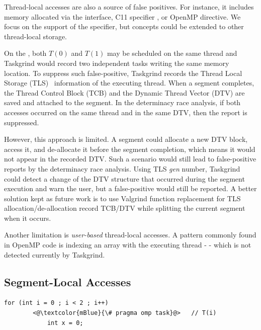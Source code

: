 Thread-local accesses are also a source of false positives.
For instance, it includes memory allocated via the  interface, C11 specifier , or OpenMP  directive.
We focus on the support of the  specifier, but concepts could be extended to other thread-local storage.

On the , both $T(0)$ and $T(1)$ may be scheduled on the same thread and Taskgrind would record two independent tasks writing the same memory location.
To suppress such false-positive, Taskgrind records the Thread Local Storage (TLS)~\cite{elf-tls} information of the executing thread.
When a segment completes, the Thread Control Block (TCB) and the Dynamic Thread Vector (DTV) are saved and attached to the segment.
In the determinacy race analysis, if both accesses occurred on the same thread and in the same DTV, then the report is suppressed.

However, this approach is limited.
A segment could allocate a new DTV block, access it, and de-allocate it before the segment completion, which means it would not appear in the recorded DTV.
Such a scenario would still lead to false-positive reports by the determinacy race analysis.
Using TLS \emph{gen} number, Taskgrind could detect a change of the DTV structure that occurred during the segment execution and warn the user, but a false-positive would still be reported.
A better solution kept as future work is to use Valgrind function replacement for TLS allocation/de-allocation record TCB/DTV while splitting the current segment when it occurs.

Another limitation is \emph{user-based} thread-local accesses.
A pattern commonly found in OpenMP code is indexing an array with the executing thread -  - which is not detected currently by Taskgrind.


\subsection{Segment-Local Accesses}

\begin{minipage}{\linewidth}
\begin{lstlisting}[style=CStyle, captionpos=b, caption={Memory Recycling false-positives}, label={lst:task-local-false-positive}]
	for (int i = 0 ; i < 2 ; i++)
		<@\textcolor{mBlue}{\# pragma omp task}@>	// T(i)
			int x = 0;
\end{lstlisting}
\end{minipage}

